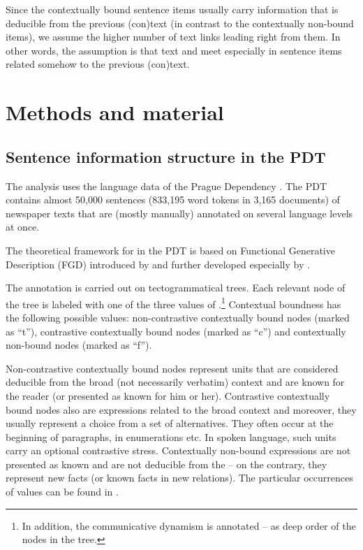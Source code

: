 \documentclass[output=paper]{langsci/langscibook.cls}
\begin{document}
Since the contextually bound sentence items usually carry information that is deducible from the previous (con)text (in contrast to the contextually non-bound items), we assume the higher number of text  links leading right from them. In other words, the assumption is that text  and  meet especially in sentence items related somehow to the previous (con)text.

\section{Methods and material\label{rysova_k:sec:MethodsAndMaterial}}

\subsection{Sentence information structure in the PDT\label{rysova_k:sec:SentenceInformation}}

The analysis uses the language data of the Prague Dependency . The PDT contains almost 50,000 sentences (833,195 word tokens in 3,165 documents) of  newspaper texts that are (mostly manually) annotated on several language levels at once. 

The theoretical framework for  in the PDT is based on Functional Generative Description (FGD) introduced by \citet{Sgall1967} and further developed especially by \citet{hajicova1998topic}. 

The annotation is carried out on tectogrammatical trees. Each relevant node of the tree is labeled with one of the three values of .\footnote{In addition, the communicative dynamism is annotated -- as deep order of the nodes in the tree.} Contextual boundness has the following possible values: non-contrastive contextually bound nodes (marked as ``t''), contrastive contextually bound nodes (marked as ``c'') and contextually non-bound nodes (marked as ``f''). 

Non-contrastive contextually bound nodes represent units that are considered deducible from the broad (not necessarily verbatim) context and are known for the reader (or presented as known for him or her). Contrastive contextually bound nodes also are expressions related to the broad context and moreover, they usually represent a choice from a set of alternatives. They often occur at the beginning of paragraphs, in enumerations etc. In spoken language, such units carry an optional contrastive stress. Contextually non-bound expressions are not presented as known and are not deducible from the  -- on the contrary, they represent new facts (or known facts in new relations). The particular occurrences of  values can be found in .
\end{document}
